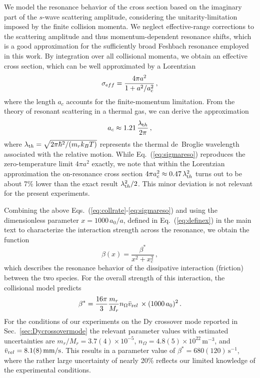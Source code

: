 We model the resonance behavior of the cross section based on the imaginary part of the $s$-wave scattering amplitude, considering the unitarity-limitation imposed by the finite collision momenta.
We neglect effective-range corrections to the scattering amplitude and thus momentum-dependent resonance shifts, which is a good approximation for the sufficiently broad Feshbach resonance employed in this work. By integration over all collisional momenta, we obtain an effective cross section, which can be well approximated by a Lorentzian
\begin{equation}
	\sigma_{\textrm eff} = \frac{4 \pi a^2}{1+a^2/a_c^2} \, ,
	\label{eq:sigmareso}
\end{equation}
where the length $a_c$ accounts for the finite-momentum limitation. From the theory of resonant scattering in a thermal gas, we can derive the approximation 
\begin{equation}
	a_c \approx 1.21\,\frac{\lambda_{\textrm th}}{2 \pi} \, ,
	\label{eq:ac}
\end{equation}
where $\lambda_{\textrm th} = \sqrt{2 \pi \hbar^2/(m_r k_B T)}$ represents the thermal de~Broglie wavelength associated with the relative motion. While Eq.~(\ref{eq:sigmareso}) reproduces the zero-temperature limit $4\pi a^2$ exactly, we note that within the Lorentzian approximation the on-resonance cross section $4\pi a_c^2 \approx 0.47\,\lambda_{\textrm th}^2$ turns out to be about 7\% lower than the exact result $\lambda_{\textrm th}^2/2$. This minor deviation is not relevant for the present experiments.

Combining the above Eqs.~(\ref{eq:collrate}-\ref{eq:sigmareso}) and using the dimensionless parameter $x = 1000\,a_0/a$, defined in Eq.~(\ref{eq:definex}) in the main text to characterize the interaction strength across the resonance, we obtain the function
\begin{equation}
	\beta(x) = \frac{\beta^*}{x^2 + x_c^2} \, ,
\end{equation}
which describes the resonance behavior of the dissipative interaction (friction) between the two species.
For the overall strength of this interaction, the collisional model predicts 
\begin{equation}\label{eq:betastar}
	\beta^* = \frac{16 \pi } {3} \frac{ m_r } { M_r} n_{\Omega} \bar{v}_{\textrm rel}  \,  \times (1000\,a_0)^2 \, .
\end{equation}
For the conditions of our experiments on the Dy crossover mode reported in Sec.~\ref{sec:Dycrossovermode} the relevant parameter values with estimated uncertainties are
$m_r/M_r = 3.7(4) \times 10^{-5}$, $n_{\Omega} = 4.8(5) \times 10^{22}\,\textrm{m}^{-3}$, and $\bar{v}_{\textrm rel} = 8.1(8)\,\textrm{mm/s}$. 
This results in a parameter value of $\beta^* =  680(120)\,\mathrm{s}^{-1}$, where the
rather large uncertainty of nearly 20\% reflects our limited knowledge of the experimental conditions.



